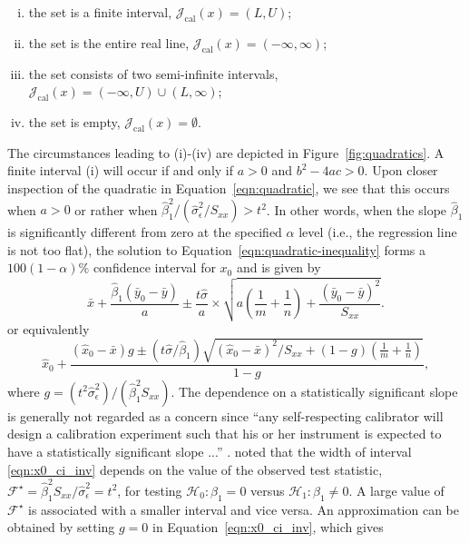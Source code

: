 \documentclass[cmfont,usenames,dvipsnames,leqno]{afit-etd}\usepackage[]{graphicx}\usepackage[]{color}
\newcommand{\boot}{\star} %
\newcommand{\mc}[1]{\ensuremath{\mathcal{#1}}}
\newcommand{\wh}[1]{\ensuremath{\widehat{#1}}}
\begin{document}
\begin{enumerate}[(i)]
  \item the set is a finite interval, $\mathcal{J}_\mathrm{cal}\left(x\right) = (L, U)$; 
  \item the set is the entire real line, $\mathcal{J}_\mathrm{cal}\left(x\right) = (-\infty, \infty)$; 
  \item the set consists of two semi-infinite intervals, $\mathcal{J}_\mathrm{cal}\left(x\right) = (-\infty, U) \cup (L, \infty)$; 
  \item the set is empty, $\mathcal{J}_\mathrm{cal}\left(x\right) = \emptyset$. 
\end{enumerate}
The circumstances leading to (i)-(iv) are depicted in Figure~\ref{fig:quadratics}. A finite interval (i) will occur if and only if $a > 0$ and $b^2 - 4ac > 0$. Upon closer inspection of the quadratic in Equation~\eqref{eqn:quadratic}, we see that this occurs when $a > 0$ or rather when $\wh{\beta}_1^2/(\wh{\sigma}_\epsilon^2/S_{xx}) > t^2$. In other words, when the slope $\wh{\beta}_1$ is significantly different from zero at the specified $\alpha$ level (i.e., the regression line is not too flat), the solution to Equation~\eqref{eqn:quadratic-inequality} forms a $100(1-\alpha)\%$ confidence interval for $x_0$ and is given by
\begin{equation}
\label{eqn:x0_ci_inv}
  \bar{x} + \frac{\wh{\beta}_1(\bar{y}_0-\bar{y})}{a} \pm \frac{t\wh{\sigma}}{a} \times \sqrt{a\left(\frac{1}{m}+\frac{1}{n}\right) + \frac{(\bar{y}_0-\bar{y})^2}{S_{xx}}}.
\end{equation}
or equivalently
\begin{equation*}
  \wh{x}_0 + \frac{(\wh{x}_0-\bar{x})g \pm \left(t\wh{\sigma}/\wh{\beta}_1\right)\sqrt{(\wh{x}_0-\bar{x})^2/S_{xx} + (1-g)\left(\frac{1}{m}+\frac{1}{n}\right)}}{1-g},
\end{equation*}
where $g = \left(t^2\wh{\sigma}_\epsilon^2\right)/(\wh{\beta}_1^2 S_{xx})$. The dependence on a statistically significant slope is generally not regarded as a concern since ``any self-respecting calibrator will design a calibration experiment such that his or her instrument is expected to have a statistically significant slope ...'' \citep[pp. 25]{brown_measurement_1993}. \citet{hoadley_bayesian_1970} noted that the width of interval \eqref{eqn:x0_ci_inv} depends on the value of the observed test statistic, $\mc{F}^\boot = \wh{\beta}_1^2S_{xx}/\wh{\sigma}_\epsilon^2 = t^2$, for testing $\mc{H}_0: \beta_1 = 0$ versus $\mc{H}_1: \beta_1 \ne 0$. A large value of $\mc{F}^\boot$ is associated with a smaller interval and vice versa. An approximation can be obtained by setting $g = 0$ in Equation~\eqref{eqn:x0_ci_inv}, which gives
\end{document}
